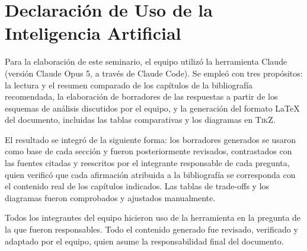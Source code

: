 \documentclass[12pt,a4paper]{article}
\begin{document}







\newpage
{}


\newpage
\section*{Declaración de Uso de la Inteligencia Artificial}

Para la elaboración de este seminario, el equipo utilizó la herramienta Claude (versión Claude Opus 5, a través de Claude Code). Se empleó con tres propósitos: la lectura y el resumen comparado de los capítulos de la bibliografía recomendada, la elaboración de borradores de las respuestas a partir de los esquemas de análisis discutidos por el equipo, y la generación del formato LaTeX del documento, incluidas las tablas comparativas y los diagramas en \textsc{TikZ}.

El resultado se integró de la siguiente forma: los borradores generados se usaron como base de cada sección y fueron posteriormente revisados, contrastados con las fuentes citadas y reescritos por el integrante responsable de cada pregunta, quien verificó que cada afirmación atribuida a la bibliografía se corresponda con el contenido real de los capítulos indicados. Las tablas de trade-offs y los diagramas fueron comprobados y ajustados manualmente.

Todos los integrantes del equipo hicieron uso de la herramienta en la pregunta de la que fueron responsables. Todo el contenido generado fue revisado, verificado y adaptado por el equipo, quien asume la responsabilidad final del documento.
\end{document}
